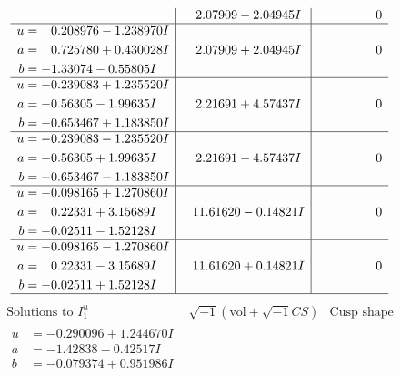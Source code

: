 \documentclass[1p]{elsarticle_modified}
\theoremstyle{definition}
\newcommand{\I}{\sqrt{-1}}
\begin{document}
$$\begin{array}{c|c|c}
 & \phantom{-}2.07909 - 2.04945 I & \phantom{-0.000000 } 0 \\ \hline\begin{aligned}
u &= \phantom{-}0.208976 - 1.238970 I \\
a &= \phantom{-}0.725780 + 0.430028 I \\
b &= -1.33074 - 0.55805 I\end{aligned}
 & \phantom{-}2.07909 + 2.04945 I & \phantom{-0.000000 } 0 \\ \hline\begin{aligned}
u &= -0.239083 + 1.235520 I \\
a &= -0.56305 - 1.99635 I \\
b &= -0.653467 + 1.183850 I\end{aligned}
 & \phantom{-}2.21691 + 4.57437 I & \phantom{-0.000000 } 0 \\ \hline\begin{aligned}
u &= -0.239083 - 1.235520 I \\
a &= -0.56305 + 1.99635 I \\
b &= -0.653467 - 1.183850 I\end{aligned}
 & \phantom{-}2.21691 - 4.57437 I & \phantom{-0.000000 } 0 \\ \hline\begin{aligned}
u &= -0.098165 + 1.270860 I \\
a &= \phantom{-}0.22331 + 3.15689 I \\
b &= -0.02511 - 1.52128 I\end{aligned}
 & \phantom{-}11.61620 - 0.14821 I & \phantom{-0.000000 } 0 \\ \hline\begin{aligned}
u &= -0.098165 - 1.270860 I \\
a &= \phantom{-}0.22331 - 3.15689 I \\
b &= -0.02511 + 1.52128 I\end{aligned}
 & \phantom{-}11.61620 + 0.14821 I & \phantom{-0.000000 } 0\\
 \hline 
 \end{array}$$\newpage$$\begin{array}{c|c|c}  
\text{Solutions to }I^u_{1}& \I (\text{vol} + \sqrt{-1}CS) & \text{Cusp shape}\\
 \hline 
\begin{aligned}
u &= -0.290096 + 1.244670 I \\
a &= -1.42838 - 0.42517 I \\
b &= -0.079374 + 0.951986 I\end{aligned}

\end{array}$$
\end{document}
